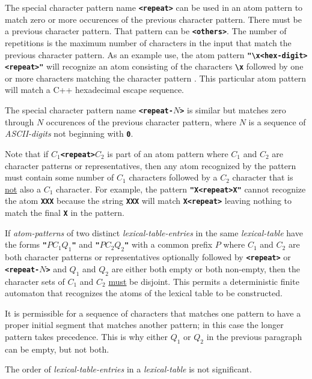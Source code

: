 \documentclass[12pt]{article}
\newcommand{\TT}[1]{{\tt \bfseries #1}}
\begin{document}
The special character pattern name
\TT{<{repeat}>}%
%
\label{<REPEAT>}
can be used in an atom pattern to match zero or more occurences of
the previous character pattern.  There must be a previous character
pattern.  That pattern can be \TT{<others>}.
The number of repetitions is the maximum number of characters in
the input that match the previous character pattern.
As an example use, the atom pattern \TT{"\textbackslash x<hex-digit><repeat>"}
will recognize an atom consisting of the characters \TT{\textbackslash x}
followed by one or more characters matching the character pattern
\TT{<hex-digit>}.  This particular atom pattern will match a C++
hexadecimal escape sequence.

The special character pattern name
\TT{<{repeat-$N$}>}%
%
is similar but matches zero through $N$ occurences of the previous
character pattern, where $N$ is a sequence of {\em ASCII-digits}
not beginning with \TT{0}.

Note that if \TT{$C_1$<repeat>$C_2$} is part of an atom pattern where
$C_1$ and $C_2$ are character patterns or representatives, then
any atom recognized by the pattern must contain some number of
$C_1$ characters followed by a $C_2$ character that is \underline{not} also
a $C_1$ character.
For example, the pattern
\TT{"X<repeat>X"} cannot recognize the atom \TT{XXX} because the
string \TT{XXX} will match \TT{X<repeat>} leaving nothing to match
the final \TT{X} in the pattern.

If {\em atom-patterns} of two distinct {\em lexical-table-entries}
in the same {\em lexical-table} have the forms 
\TT{"}$PC_1Q_1$\TT{"} and \TT{"}$PC_2Q_2$\TT{"} with a common
prefix $P$ where
$C_1$ and $C_2$ are both character patterns or representatives
optionally followed
by \TT{<repeat>} or \TT{<repeat-$N$>} and
$Q_1$ and $Q_2$ are either both empty or both non-empty,
then the character sets of $C_1$ and $C_2$ \underline{must}
be disjoint.  This permits a deterministic finite automaton that
recognizes the atoms of the lexical table to be constructed.

It is permissible for
a sequence of characters that matches one pattern to have a proper
initial segment that matches another pattern; in this case the
longer pattern takes precedence.  This is why either $Q_1$ or $Q_2$
in the previous paragraph can be empty, but not both.

The order of {\em lexical-table-entries}
in a {\em lexical-table} is not significant.
\end{document}
